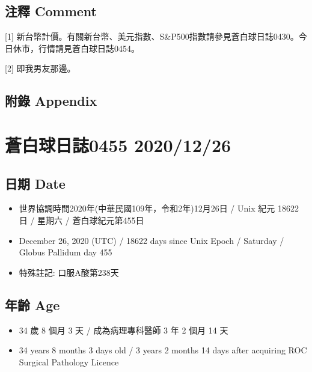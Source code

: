 \documentclass[a5paper, 11pt
]{book}
\providecommand{\tightlist}{%
  \setlength{\itemsep}{0pt}\setlength{\parskip}{0pt}}
\begin{document}
\hypertarget{ux6ce8ux91cb-comment-24}{%
\subsection{注釋 Comment}\label{ux6ce8ux91cb-comment-24}}

{[}1{]}
新台幣計價。有關新台幣、美元指數、S\&P500指數請參見蒼白球日誌0430。今日休市，行情請見蒼白球日誌0454。

{[}2{]} 即我男友那邊。

\hypertarget{ux9644ux9304-appendix-24}{%
\subsection{附錄 Appendix}\label{ux9644ux9304-appendix-24}}

\hypertarget{ux84bcux767dux7403ux65e5ux8a8c0455-20201226}{%
\section{蒼白球日誌0455
2020/12/26}\label{ux84bcux767dux7403ux65e5ux8a8c0455-20201226}}

\hypertarget{ux65e5ux671f-date-25}{%
\subsection{日期 Date}\label{ux65e5ux671f-date-25}}

\begin{itemize}
\tightlist
\item
  世界協調時間2020年(中華民國109年，令和2年)12月26日 / Unix 紀元 18622
  日 / 星期六 / 蒼白球紀元第455日
\item
  December 26, 2020 (UTC) / 18622 days since Unix Epoch / Saturday /
  Globus Pallidum day 455
\item
  特殊註記: 口服A酸第238天
\end{itemize}

\hypertarget{ux5e74ux9f61-age-25}{%
\subsection{年齡 Age}\label{ux5e74ux9f61-age-25}}

\begin{itemize}
\tightlist
\item
  34 歲 8 個月 3 天 / 成為病理專科醫師 3 年 2 個月 14 天
\item
  34 years 8 months 3 days old / 3 years 2 months 14 days after
  acquiring ROC Surgical Pathology Licence
\end{itemize}
\end{document}
